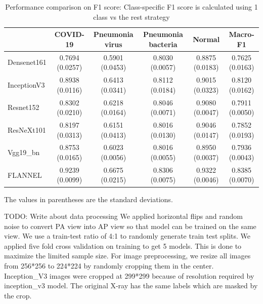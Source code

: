 \documentclass{sigkddExp}
\begin{document}
\begin{table}
    \centering
    \caption{Performance comparison on F1 score: Class-specific F1 score is calculated using 1 class vs the rest strategy}
    \label{table:resultstats}
    \begin{tabular}{ lccccc } \hline
                    & COVID-19        & Pneumonia virus & Pneumonia bacteria & Normal          & Macro-F1        \\ \hline

        Densenet161 & 0.7694 (0.0257) & 0.5901 (0.0453) & 0.8030 (0.0057)    & 0.8875 (0.0183) & 0.7625 (0.0163) \\
        InceptionV3 & 0.8938 (0.0116) & 0.6413 (0.0341) & 0.8112 (0.0184)    & 0.9015 (0.0323) & 0.8120 (0.0162) \\
        Resnet152   & 0.8302 (0.0210) & 0.6218 (0.0164) & 0.8046 (0.0071)    & 0.9080 (0.0047) & 0.7911 (0.0050) \\
        ResNeXt101  & 0.8197 (0.0313) & 0.6151 (0.0413) & 0.8016 (0.0130)    & 0.9046 (0.0147) & 0.7852 (0.0193) \\
        Vgg19\_bn   & 0.8753 (0.0165) & 0.6023 (0.0056) & 0.8016 (0.0055)    & 0.8950 (0.0037) & 0.7936 (0.0043) \\
        FLANNEL     & 0.9239 (0.0099) & 0.6675 (0.0215) & 0.8306 (0.0075)    & 0.9322 (0.0046) & 0.8385 (0.0070) \\ \hline
    \end{tabular}\par
    \bigskip
    The values in parentheses are the standard deviations.
\end{table}

TODO:
Write about data processing
We applied horizontal flips and random noise to convert PA view into AP view so
that model can be trained on the same view. We use a train-test ratio of 4:1 to
randomly generate train test splits. We applied five fold cross validation on
training to get 5 models. This is done to maximize the limited sample size. For
image preprocessing, we resize all images from 256*256 to 224*224 by randomly
cropping them in the center. Inception\_V3 images were cropped at 299*299 because
of resolution required by inception\_v3 model. The original X-ray has the same
labels which are masked by the crop.
\end{document}
